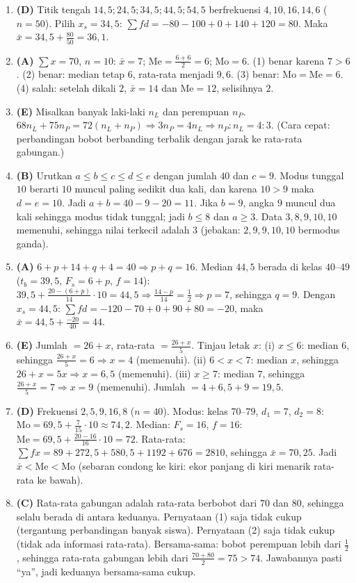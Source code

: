 \documentclass[a4paper,11pt]{article}
\newcommand{\dis}{\displaystyle}
\newcommand{\Me}{\mathrm{Me}}
\newcommand{\Mo}{\mathrm{Mo}}
\begin{document}
\begin{enumerate}[leftmargin=2em,itemsep=2pt,topsep=2pt]
\item[\textbf{13.}] \textbf{(D)} Titik tengah $14{,}5;24{,}5;34{,}5;44{,}5;54{,}5$ berfrekuensi $4,10,16,14,6$ ($n=50$). Pilih $x_s=34{,}5$: $\sum fd=-80-100+0+140+120=80$. Maka $\bar{x}=34{,}5+\dis\frac{80}{50}=36{,}1$.
\item[\textbf{14.}] \textbf{(A)} $\sum x=70$, $n=10$: $\bar{x}=7$; $\Me=\dis\frac{6+6}{2}=6$; $\Mo=6$. (1) benar karena $7>6$. (2) benar: median tetap $6$, rata-rata menjadi $9{,}6$. (3) benar: $\Mo=\Me=6$. (4) salah: setelah dikali $2$, $\bar{x}=14$ dan $\Me=12$, selisihnya $2$.
\item[\textbf{15.}] \textbf{(E)} Misalkan banyak laki-laki $n_L$ dan perempuan $n_P$. $68n_L+75n_P=72(n_L+n_P)\Rightarrow3n_P=4n_L\Rightarrow n_P:n_L=4:3$. (Cara cepat: perbandingan bobot berbanding terbalik dengan jarak ke rata-rata gabungan.)
\item[\textbf{16.}] \textbf{(B)} Urutkan $a\le b\le c\le d\le e$ dengan jumlah $40$ dan $c=9$. Modus tunggal $10$ berarti $10$ muncul paling sedikit dua kali, dan karena $10>9$ maka $d=e=10$. Jadi $a+b=40-9-20=11$. Jika $b=9$, angka $9$ muncul dua kali sehingga modus tidak tunggal; jadi $b\le8$ dan $a\ge3$. Data $3,8,9,10,10$ memenuhi, sehingga nilai terkecil adalah $3$ (jebakan: $2,9,9,10,10$ bermodus ganda).
\item[\textbf{17.}] \textbf{(A)} $6+p+14+q+4=40\Rightarrow p+q=16$. Median $44{,}5$ berada di kelas $40$--$49$ ($t_b=39{,}5$, $F_s=6+p$, $f=14$): $39{,}5+\dis\frac{20-(6+p)}{14}\cdot10=44{,}5\Rightarrow\dis\frac{14-p}{14}=\dis\frac12\Rightarrow p=7$, sehingga $q=9$. Dengan $x_s=44{,}5$: $\sum fd=-120-70+0+90+80=-20$, maka $\bar{x}=44{,}5+\dis\frac{-20}{40}=44$.
\item[\textbf{18.}] \textbf{(E)} Jumlah $=26+x$, rata-rata $=\dis\frac{26+x}{5}$. Tinjau letak $x$: (i) $x\le6$: median $6$, sehingga $\dis\frac{26+x}{5}=6\Rightarrow x=4$ (memenuhi). (ii) $6<x<7$: median $x$, sehingga $26+x=5x\Rightarrow x=6{,}5$ (memenuhi). (iii) $x\ge7$: median $7$, sehingga $\dis\frac{26+x}{5}=7\Rightarrow x=9$ (memenuhi). Jumlah $=4+6{,}5+9=19{,}5$.
\item[\textbf{19.}] \textbf{(D)} Frekuensi $2,5,9,16,8$ ($n=40$). Modus: kelas $70$--$79$, $d_1=7$, $d_2=8$: $\Mo=69{,}5+\dis{\frac{7}{15}}\cdot10\approx74{,}2$. Median: $F_s=16$, $f=16$: $\Me=69{,}5+\dis\frac{20-16}{16}\cdot10=72$. Rata-rata: $\sum fx=89+272{,}5+580{,}5+1192+676=2810$, sehingga $\bar{x}=70{,}25$. Jadi $\bar{x}<\Me<\Mo$ (sebaran condong ke kiri: ekor panjang di kiri menarik rata-rata ke bawah).
\item[\textbf{20.}] \textbf{(C)} Rata-rata gabungan adalah rata-rata berbobot dari $70$ dan $80$, sehingga selalu berada di antara keduanya. Pernyataan (1) saja tidak cukup (tergantung perbandingan banyak siswa). Pernyataan (2) saja tidak cukup (tidak ada informasi rata-rata). Bersama-sama: bobot perempuan lebih dari $\dis\frac12$, sehingga rata-rata gabungan lebih dari $\dis\frac{70+80}{2}=75>74$. Jawabannya pasti ``ya'', jadi keduanya bersama-sama cukup.
\end{enumerate}
\end{document}
